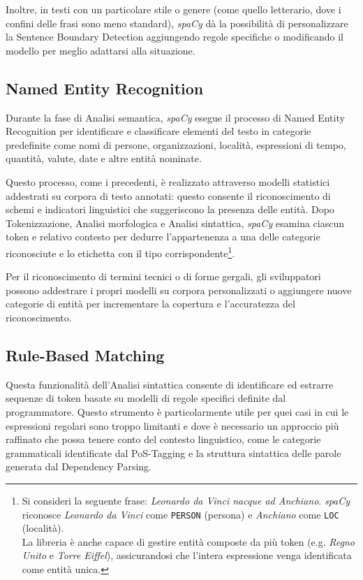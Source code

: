\documentclass[12pt]{report}
\newcommand{\spacy}{\textsl{spaCy}\xspace}
\begin{document}
Inoltre, in testi con un particolare stile o genere (come quello letterario, dove i confini delle frasi sono meno standard), \spacy dà la possibilità di personalizzare la Sentence Boundary Detection aggiungendo regole specifiche o modificando il modello per meglio adattarsi alla situazione.


\subsection{Named Entity Recognition}
Durante la fase di \textsf{Analisi semantica}, \spacy esegue il processo di Named Entity Recognition per identificare e classificare elementi del testo in categorie predefinite come nomi di persone, organizzazioni, località, espressioni di tempo, quantità, valute, date e altre entità nominate.

Questo processo, come i precedenti, è realizzato attraverso modelli statistici addestrati su corpora di testo annotati: questo consente il riconoscimento di schemi e indicatori linguistici che suggeriscono la presenza delle entità. Dopo \textsf{Tokenizzazione}, \textsf{Analisi morfologica} e \textsf{Analisi sintattica}, \spacy  esamina ciascun token e relativo contesto per dedurre l'appartenenza a una delle categorie riconosciute e lo etichetta con il tipo corrispondente\footnote{Si consideri la seguente frase: \textit{Leonardo da Vinci nacque ad Anchiano}. \spacy riconosce \textit{Leonardo da Vinci} come \texttt{PERSON} (persona) e \textit{Anchiano} come \texttt{LOC} (località).\\
La libreria è anche capace di gestire entità composte da più token (e.g. \textit{Regno Unito} e \textit{Torre Eiffel}), assicurandosi che l'intera espressione venga identificata come entità unica.}.

Per il riconoscimento di termini tecnici o di forme gergali, gli sviluppatori possono addestrare i propri modelli su corpora personalizzati o aggiungere nuove categorie di entità per incrementare la copertura e l’accuratezza del riconoscimento.


\subsection{Rule-Based Matching}
Questa funzionalità dell'\textsf{Analisi sintattica} consente di identificare ed estrarre sequenze di token basate su modelli di regole specifici definite dal programmatore. Questo strumento è particolarmente utile per quei casi in cui le espressioni regolari sono troppo limitanti e dove è necessario un approccio più raffinato che possa tenere conto del contesto linguistico, come le categorie grammaticali identificate dal PoS-Tagging e la struttura sintattica delle parole generata dal Dependency Parsing.
\end{document}
